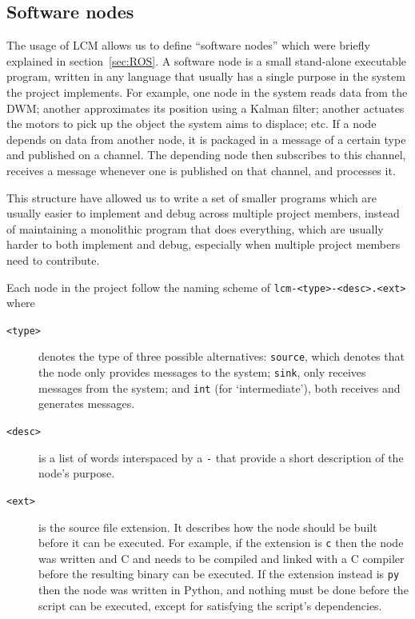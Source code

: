 \subsection{Software nodes}
\label{sec:nodes}
The usage of LCM allows us to define ``software nodes'' which were briefly explained in section~\ref{sec:ROS}.
A software node is a small stand-alone executable program, written in any language that usually has a single purpose in the system the project implements.
For example, one node in the system reads data from the DWM;
another approximates its position using a Kalman filter;
another actuates the motors to pick up the object the system aims to displace; etc.
If a node depends on data from another node,
it is packaged in a message of a certain type and published on a channel.
The depending node then subscribes to this channel,
receives a message whenever one is published on that channel,
and processes it.

This structure have allowed us to write a set of smaller programs which are usually easier to implement and debug across multiple project members,
instead of maintaining a monolithic program that does everything, which are usually harder to both implement and debug,
especially when multiple project members need to contribute.


Each node in the project follow the naming scheme of \texttt{lcm-<type>-<desc>.<ext>} where
\begin{description}
\item[\texttt{<type>}] denotes the type of three possible alternatives:
  \texttt{source}, which denotes that the node only provides messages to the system;
  \texttt{sink}, only receives messages from the system; and
  \texttt{int} (for `intermediate'), both receives and generates messages.
\item[\texttt{<desc>}] is a list of words interspaced by a \texttt{-} that provide a short description of the node's purpose.
\item[\texttt{<ext>}] is the source file extension. It describes how the node should be built before it can be executed.
  For example, if the extension is \texttt{c} then the node was written and C and needs to be compiled and linked with a C compiler before the resulting binary can be executed.
  If the extension instead is \texttt{py} then the node was written in Python, and nothing must be done before the script can be executed,
  except for satisfying the script's dependencies.
\end{description}

